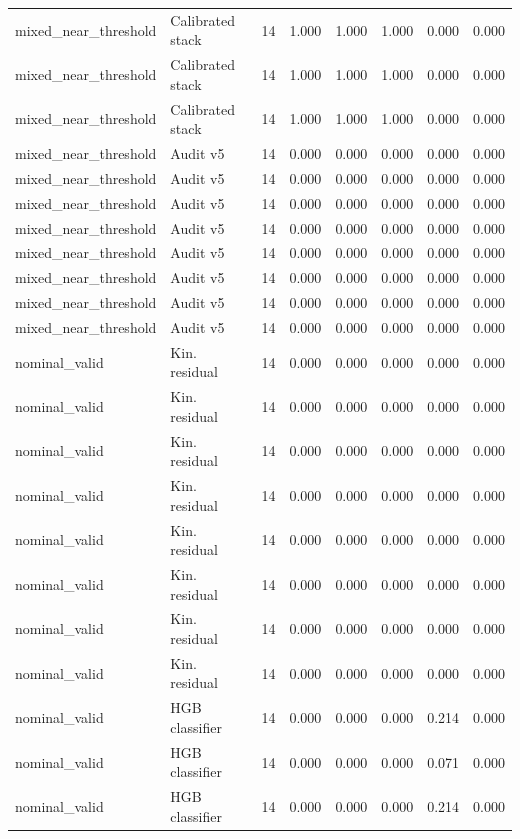 {\begin{longtable}{llrrrrrr}
mixed\_near\_threshold & Calibrated stack & 14 & 1.000 & 1.000 & 1.000 & 0.000 & 0.000 \\
mixed\_near\_threshold & Calibrated stack & 14 & 1.000 & 1.000 & 1.000 & 0.000 & 0.000 \\
mixed\_near\_threshold & Calibrated stack & 14 & 1.000 & 1.000 & 1.000 & 0.000 & 0.000 \\
mixed\_near\_threshold & Audit v5 & 14 & 0.000 & 0.000 & 0.000 & 0.000 & 0.000 \\
mixed\_near\_threshold & Audit v5 & 14 & 0.000 & 0.000 & 0.000 & 0.000 & 0.000 \\
mixed\_near\_threshold & Audit v5 & 14 & 0.000 & 0.000 & 0.000 & 0.000 & 0.000 \\
mixed\_near\_threshold & Audit v5 & 14 & 0.000 & 0.000 & 0.000 & 0.000 & 0.000 \\
mixed\_near\_threshold & Audit v5 & 14 & 0.000 & 0.000 & 0.000 & 0.000 & 0.000 \\
mixed\_near\_threshold & Audit v5 & 14 & 0.000 & 0.000 & 0.000 & 0.000 & 0.000 \\
mixed\_near\_threshold & Audit v5 & 14 & 0.000 & 0.000 & 0.000 & 0.000 & 0.000 \\
mixed\_near\_threshold & Audit v5 & 14 & 0.000 & 0.000 & 0.000 & 0.000 & 0.000 \\
nominal\_valid & Kin. residual & 14 & 0.000 & 0.000 & 0.000 & 0.000 & 0.000 \\
nominal\_valid & Kin. residual & 14 & 0.000 & 0.000 & 0.000 & 0.000 & 0.000 \\
nominal\_valid & Kin. residual & 14 & 0.000 & 0.000 & 0.000 & 0.000 & 0.000 \\
nominal\_valid & Kin. residual & 14 & 0.000 & 0.000 & 0.000 & 0.000 & 0.000 \\
nominal\_valid & Kin. residual & 14 & 0.000 & 0.000 & 0.000 & 0.000 & 0.000 \\
nominal\_valid & Kin. residual & 14 & 0.000 & 0.000 & 0.000 & 0.000 & 0.000 \\
nominal\_valid & Kin. residual & 14 & 0.000 & 0.000 & 0.000 & 0.000 & 0.000 \\
nominal\_valid & Kin. residual & 14 & 0.000 & 0.000 & 0.000 & 0.000 & 0.000 \\
nominal\_valid & HGB classifier & 14 & 0.000 & 0.000 & 0.000 & 0.214 & 0.000 \\
nominal\_valid & HGB classifier & 14 & 0.000 & 0.000 & 0.000 & 0.071 & 0.000 \\
nominal\_valid & HGB classifier & 14 & 0.000 & 0.000 & 0.000 & 0.214 & 0.000 \\

\end{longtable}}
